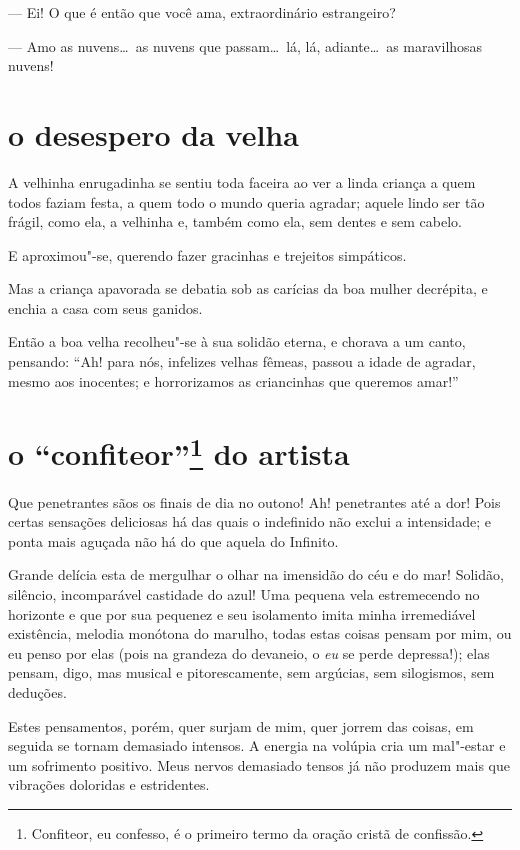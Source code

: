 --- Ei! O que é então que você ama, extraordinário estrangeiro?

--- Amo as nuvens\ldots\  as nuvens que passam\ldots\  lá, lá, adiante\ldots\  as
maravilhosas nuvens!

\quebra\section[O desespero da velha]{o desespero da velha}

A velhinha enrugadinha se sentiu toda faceira ao ver a linda criança a
quem todos faziam festa, a quem todo o mundo queria agradar; aquele lindo
ser tão frágil, como ela, a velhinha e, também como ela, sem dentes e
sem cabelo.

E aproximou"-se, querendo fazer gracinhas e trejeitos
simpáticos.

Mas a criança apavorada se debatia sob as carícias da boa mulher
decrépita, e enchia a casa com seus ganidos.

Então a boa velha recolheu"-se à sua solidão eterna, e chorava a um
canto, pensando: “Ah! para nós, infelizes velhas fêmeas,
passou a idade de agradar, mesmo aos inocentes; e horrorizamos as
criancinhas que queremos amar!”

\quebra\section[O “confiteor'']{o “confiteor''\protect\footnote{ Confiteor, eu confesso, é o primeiro
termo da oração cristã de confissão.} do artista}

Que penetrantes sãos os finais de dia no outono! Ah! penetrantes até a
dor! Pois certas sensações deliciosas há das quais o indefinido não
exclui a intensidade; e ponta mais aguçada não há do que aquela do
Infinito.

Grande delícia esta de mergulhar o olhar na imensidão do céu e do mar!
Solidão, silêncio, incomparável castidade do azul! Uma pequena vela
estremecendo no horizonte e que por sua pequenez e seu isolamento
imita minha irremediável existência, melodia monótona do marulho, todas
estas coisas pensam por mim, ou eu penso por elas (pois na grandeza do
devaneio, o \textit{eu} se perde depressa!); elas pensam, digo, mas musical e
pitorescamente, sem argúcias, sem silogismos, sem deduções.

Estes pensamentos, porém, quer surjam de mim, quer jorrem das
coisas, em seguida se tornam demasiado intensos. A energia na volúpia cria
um mal"-estar e um sofrimento positivo. Meus nervos demasiado tensos
já não produzem mais que vibrações doloridas e estridentes.

